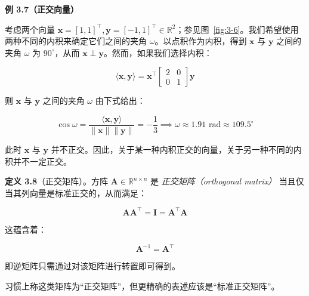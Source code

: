 \begin{notebox}
\textbf{例 3.7（正交向量）}
\end{notebox}

\begin{notebox}
考虑两个向量 $ \boldsymbol{x} = [1, 1]^\top, \boldsymbol{y} = [-1, 1]^\top \in \mathbb{R}^2 $；参见图~\ref{fig:3-6}。我们希望使用两种不同的内积来确定它们之间的夹角 $ \omega $。以点积作为内积，得到 $ \boldsymbol{x} $ 与 $ \boldsymbol{y} $ 之间的夹角 $ \omega $ 为 $ 90^\circ $，从而 $ \boldsymbol{x} \perp \boldsymbol{y} $。然而，如果我们选择内积：

\begin{equation}
\langle \boldsymbol{x}, \boldsymbol{y} \rangle = \boldsymbol{x}^\top \begin{bmatrix} 2 & 0 \\ 0 & 1 \end{bmatrix} \boldsymbol{y}
\tag{3.27}\label{eq:3-27}
\end{equation}

则 $ \boldsymbol{x} $ 与 $ \boldsymbol{y} $ 之间的夹角 $ \omega $ 由下式给出：

\begin{equation}
\cos \omega = \frac{\langle \boldsymbol{x}, \boldsymbol{y} \rangle}{\|\boldsymbol{x}\| \|\boldsymbol{y}\|} = -\frac{1}{3} \implies \omega \approx 1.91\text{ rad} \approx 109.5^\circ
\tag{3.28}\label{eq:3-28}
\end{equation}

此时 $ \boldsymbol{x} $ 与 $ \boldsymbol{y} $ 并不正交。因此，关于某一种内积正交的向量，关于另一种不同的内积并不一定正交。
\end{notebox}

\textbf{定义 3.8}（正交矩阵）。方阵 $ \boldsymbol{A} \in \mathbb{R}^{n \times n} $ 是 \emph{正交矩阵（orthogonal matrix）} 当且仅当其列向量是标准正交的，从而满足：

\begin{equation}
\boldsymbol{A} \boldsymbol{A}^\top = \boldsymbol{I} = \boldsymbol{A}^\top \boldsymbol{A}
\tag{3.29}\label{eq:3-29}
\end{equation}

这蕴含着：

\begin{equation}
\boldsymbol{A}^{-1} = \boldsymbol{A}^\top
\tag{3.30}\label{eq:3-30}
\end{equation}

即逆矩阵只需通过对该矩阵进行转置即可得到。

\begin{notebox}
习惯上称这类矩阵为“正交矩阵”，但更精确的表述应该是“标准正交矩阵”。
\end{notebox}

